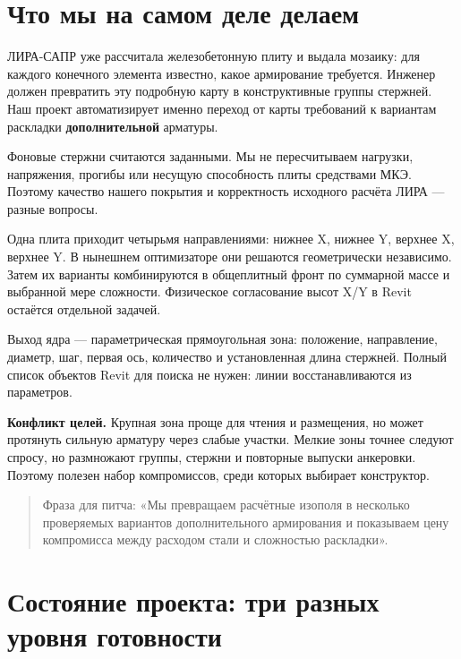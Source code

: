 \documentclass[11pt,a4paper]{article}
\begin{document}
\section{Что мы на самом деле делаем}

ЛИРА-САПР уже рассчитала железобетонную плиту и выдала мозаику: для каждого конечного элемента известно, какое армирование требуется. Инженер должен превратить эту подробную карту в конструктивные группы стержней. Наш проект автоматизирует именно переход от карты требований к вариантам раскладки \textbf{дополнительной} арматуры.


Фоновые стержни считаются заданными. Мы не пересчитываем нагрузки, напряжения, прогибы или несущую способность плиты средствами МКЭ. Поэтому качество нашего покрытия и корректность исходного расчёта ЛИРА — разные вопросы.


Одна плита приходит четырьмя направлениями: нижнее X, нижнее Y, верхнее X, верхнее Y. В нынешнем оптимизаторе они решаются геометрически независимо. Затем их варианты комбинируются в общеплитный фронт по суммарной массе и выбранной мере сложности. Физическое согласование высот X/Y в Revit остаётся отдельной задачей.


Выход ядра — параметрическая прямоугольная зона: положение, направление, диаметр, шаг, первая ось, количество и установленная длина стержней. Полный список объектов Revit для поиска не нужен: линии восстанавливаются из параметров.


\textbf{Конфликт целей.} Крупная зона проще для чтения и размещения, но может протянуть сильную арматуру через слабые участки. Мелкие зоны точнее следуют спросу, но размножают группы, стержни и повторные выпуски анкеровки. Поэтому полезен набор компромиссов, среди которых выбирает конструктор.


\begin{quote}\color{Teal}Фраза для питча: «Мы превращаем расчётные изополя в несколько проверяемых вариантов дополнительного армирования и показываем цену компромисса между расходом стали и сложностью раскладки».\end{quote}

\section{Состояние проекта: три разных уровня готовности}
\end{document}
